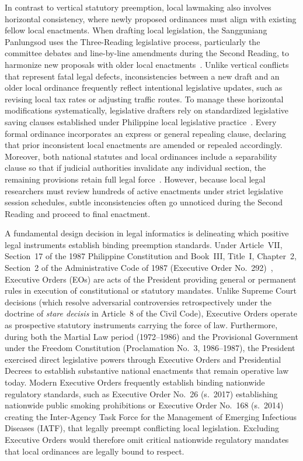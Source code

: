     In contrast to vertical statutory preemption, local lawmaking also involves horizontal consistency, where newly proposed ordinances must align with existing fellow local enactments. When drafting local legislation, the Sangguniang Panlungsod uses the Three-Reading legislative process, particularly the committee debates and line-by-line amendments during the Second Reading, to harmonize new proposals with older local enactments~\cite{spdc2022ra00122}. Unlike vertical conflicts that represent fatal legal defects, inconsistencies between a new draft and an older local ordinance frequently reflect intentional legislative updates, such as revising local tax rates or adjusting traffic routes. To manage these horizontal modifications systematically, legislative drafters rely on standardized legislative saving clauses established under Philippine local legislative practice~\cite{philgov1991ra7160, spdc2022ra00122}. Every formal ordinance incorporates an express or general repealing clause, declaring that prior inconsistent local enactments are amended or repealed accordingly. Moreover, both national statutes and local ordinances include a separability clause so that if judicial authorities invalidate any individual section, the remaining provisions retain full legal force~\cite{agpalo2009statutory}. However, because local legal researchers must review hundreds of active enactments under strict legislative session schedules, subtle inconsistencies often go unnoticed during the Second Reading and proceed to final enactment.

    A fundamental design decision in legal informatics is delineating which positive legal instruments establish binding preemption standards. Under Article~VII, Section~17 of the 1987 Philippine Constitution and Book~III, Title~I, Chapter~2, Section~2 of the Administrative Code of 1987 (Executive Order No.~292)~\cite{philgov1987eo292}, Executive Orders (EOs) are acts of the President providing general or permanent rules in execution of constitutional or statutory mandates. Unlike Supreme Court decisions (which resolve adversarial controversies retrospectively under the doctrine of \textit{stare decisis} in Article~8 of the Civil Code), Executive Orders operate as prospective statutory instruments carrying the force of law. Furthermore, during both the Martial Law period (1972--1986) and the Provisional Government under the Freedom Constitution (Proclamation No.~3, 1986--1987), the President exercised direct legislative powers through Executive Orders and Presidential Decrees to establish substantive national enactments that remain operative law today. Modern Executive Orders frequently establish binding nationwide regulatory standards, such as Executive Order No.~26 (s.~2017) establishing nationwide public smoking prohibitions or Executive Order No.~168 (s.~2014) creating the Inter-Agency Task Force for the Management of Emerging Infectious Diseases (IATF), that legally preempt conflicting local legislation. Excluding Executive Orders would therefore omit critical nationwide regulatory mandates that local ordinances are legally bound to respect.

